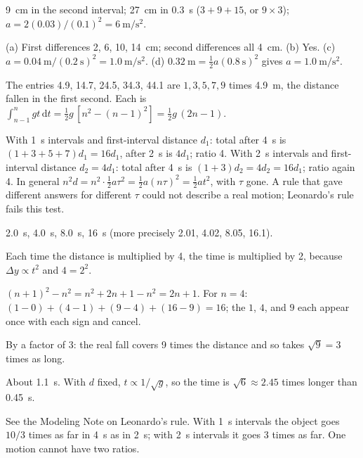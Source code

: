 \documentclass[11pt,twoside,openany]{book}
\newcommand{\dd}{\mathrm{d}}
\begin{document}
\begin{description}[leftmargin=2.6em,itemsep=3pt,style=sameline]
  \item[2.21] \SI{9}{\centi\metre} in the second interval; \SI{27}{\centi\metre} in \SI{0.3}{\second} ($3 + 9 + 15$, or $9 \times 3$); $a = 2(0.03)/(0.1)^2 = \SI{6}{\metre\per\second\squared}$.
  \item[2.22] (a) First differences \num{2}, \num{6}, \num{10}, \SI{14}{\centi\metre}; second differences all \SI{4}{\centi\metre}. (b) Yes. (c) $a = \SI{0.04}{\metre}/(\SI{0.2}{\second})^2 = \SI{1.0}{\metre\per\second\squared}$. (d) $\SI{0.32}{\metre} = \tfrac12 a (\SI{0.8}{\second})^2$ gives $a = \SI{1.0}{\metre\per\second\squared}$.
  \item[2.23] The entries \num{4.9}, \num{14.7}, \num{24.5}, \num{34.3}, \num{44.1} are $1, 3, 5, 7, 9$ times \SI{4.9}{\metre}, the distance fallen in the first second. Each is $\int_{n-1}^{n} gt\,\dd t = \tfrac12 g\,[n^2 - (n-1)^2] = \tfrac12 g\,(2n-1)$.
  \item[2.24] With \SI{1}{\second} intervals and first-interval distance $d_1$: total after \SI{4}{\second} is $(1+3+5+7)d_1 = 16d_1$, after \SI{2}{\second} is $4d_1$; ratio \num{4}. With \SI{2}{\second} intervals and first-interval distance $d_2 = 4d_1$: total after \SI{4}{\second} is $(1+3)d_2 = 4d_2 = 16d_1$; ratio again \num{4}. In general $n^2 d = n^2\cdot\tfrac12 a\tau^2 = \tfrac12 a (n\tau)^2 = \tfrac12 a t^2$, with $\tau$ gone. A rule that gave different answers for different $\tau$ could not describe a real motion; Leonardo's rule fails this test.
  \item[2.25] \SI{2.0}{\second}, \SI{4.0}{\second}, \SI{8.0}{\second}, \SI{16}{\second} (more precisely \num{2.01}, \num{4.02}, \num{8.05}, \num{16.1}).
  \item[2.26] Each time the distance is multiplied by \num{4}, the time is multiplied by \num{2}, because $\Delta y \propto t^2$ and $4 = 2^2$.
  \item[2.27] $(n+1)^2 - n^2 = n^2 + 2n + 1 - n^2 = 2n + 1$. For $n = 4$: $(1 - 0) + (4 - 1) + (9 - 4) + (16 - 9) = 16$; the $1$, $4$, and $9$ each appear once with each sign and cancel.
  \item[2.28] By a factor of \num{3}: the real fall covers \num{9} times the distance and so takes $\sqrt{9} = 3$ times as long.
  \item[2.29] About \SI{1.1}{\second}. With $d$ fixed, $t \propto 1/\sqrt{g}$, so the time is $\sqrt{6} \approx 2.45$ times longer than \SI{0.45}{\second}.
  \item[2.30] See the Modeling Note on Leonardo's rule. With \SI{1}{\second} intervals the object goes $10/3$ times as far in \SI{4}{\second} as in \SI{2}{\second}; with \SI{2}{\second} intervals it goes \num{3} times as far. One motion cannot have two ratios.

\end{description}
\end{document}
